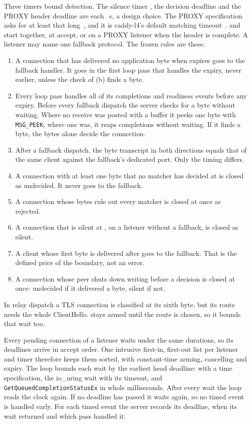 Three timers bound detection. The silence timer \Tfb, the decision deadline \Tdec{} and the PROXY
header deadline \Thdr{} are each \TimerS{}~s, a design choice. The PROXY specification asks for at
least that long~\cite{tarreau2026proxy}, and it is caddy-l4's default matching
timeout~\cite{caddyl42026}. \Tfb{} and \Tdec{} start together, at accept, or on a PROXY listener
when the header is complete. A listener may name one fallback protocol. The frozen rules are these.
\begin{enumerate}[label=(\alph*)]
\item A connection that has delivered no application byte when \Tfb{} expires goes to the fallback
handler. It goes in the first loop pass that handles the expiry, never earlier, unless the check
of (b) finds a byte.
\item Every loop pass handles all of its completions and readiness events before any expiry.
Before every fallback dispatch the server checks for a byte without waiting. Where no receive
was posted with a buffer it peeks one byte with \texttt{MSG\_PEEK}; where one was, it reaps
completions without waiting. If it finds a byte, the bytes alone decide the connection.
\item After a fallback dispatch, the byte transcript in both directions equals that of the same
client against the fallback's dedicated port. Only the timing differs.
\item A connection with at least one byte that no matcher has decided at \Tdec{} is closed as
undecided. It never goes to the fallback.
\item A connection whose bytes rule out every matcher is closed at once as rejected.
\item A connection that is silent at \Tdec{}, on a listener without a fallback, is closed as silent.
\item A client whose first byte is delivered after \Tfb{} goes to the fallback. That is the defined
price of the boundary, not an error.
\item A connection whose peer shuts down writing before a decision is closed at once: undecided
if it delivered a byte, silent if not.
\end{enumerate}
In relay dispatch a TLS connection is classified at its sixth byte, but its route needs the whole
ClientHello. \Tdec{} stays armed until the route is chosen, so it bounds that wait too.

 Every pending connection of a listener waits under the same
durations, so its deadlines arrive in accept order. One intrusive first-in, first-out list per
listener and timer therefore keeps them sorted, with constant-time arming, cancelling and expiry.
The loop bounds each wait by the earliest head deadline: \EpollWaitTwo{} with a time
specification, the io\_uring wait with its timeout, and \texttt{GetQueuedCompletionStatusEx} in
whole milliseconds. After every wait the loop reads the clock again. If no deadline has passed it
waits again, so no timed event is handled early. For each timed event the server records its
deadline, when its wait returned and which pass handled it.

